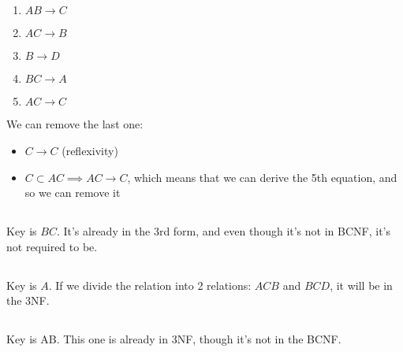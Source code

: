 \documentclass[a4paper]{article}
\begin{document}
\subsection{}
\begin{enumerate}
    \item $AB \to C$
    \item $AC \to B$
    \item $B \to D$
    \item $BC \to A$
    \item $AC \to C $
\end{enumerate}
We can remove the last one:
\begin{itemize}
    \item $C \to C$ (reflexivity)
    \item $C \subset AC \implies AC \to C$, which means that we can derive the 5th equation, and so we can remove it
\end{itemize}
\subsection{}
Key is $BC$. It's already in the 3rd form, and even though it's not in BCNF, it's not required to be.
\subsection{}
Key is $A$. If we divide the relation into 2 relations: $ACB$ and $BCD$, it will be in the 3NF.%
\subsection{}
Key is AB. This one is already in 3NF, though it's not in the BCNF.
\end{document}
